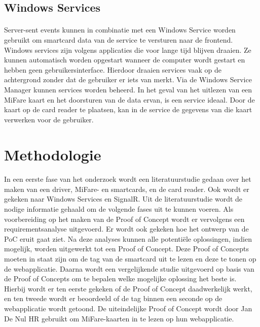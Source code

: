 \bigskip
\subsection{Windows Services}
\paragraph{}
Server-sent events kunnen in combinatie met een Windows Service worden gebruikt om smartcard data van de service te versturen naar de frontend.
Windows services zijn volgens \textcite{MicrosoftWS} applicaties die voor lange tijd blijven draaien. Ze kunnen automatisch worden opgestart wanneer de computer wordt gestart en hebben geen gebruikersinterface. Hierdoor draaien services vaak op de achtergrond zonder dat de gebruiker er iets van merkt. Via de Windows Service Manager kunnen services worden beheerd. In het geval van het uitlezen van een MiFare kaart en het doorsturen van de data ervan, is een service ideaal. Door de kaart op de card reader te plaatsen, kan in de service de gegevens van die kaart verwerken voor de gebruiker.

\bigskip
\section{Methodologie}%
\label{sec:methodologie}
\paragraph{}
In een eerste fase van het onderzoek wordt een literatuurstudie gedaan over het maken van een driver, MiFare- en smartcards, en de card reader. Ook wordt er gekeken naar Windows Services en SignalR. Uit de literatuurstudie wordt de nodige informatie gehaald om de volgende fases uit te kunnen voeren. Als voorbereiding op het maken van de Proof of Concept wordt er vervolgens een requirementsanalyse uitgevoerd. Er wordt ook gekeken hoe het ontwerp van de PoC eruit gaat ziet. Na deze analyses kunnen alle potentiële oplossingen, indien mogelijk, worden uitgewerkt tot een Proof of Concept. Deze Proof of Concepts moeten in staat zijn om de tag van de smartcard uit te lezen en deze te tonen op de webapplicatie.
Daarna wordt een vergelijkende studie uitgevoerd op basis van de Proof of Concepts om te bepalen welke mogelijke oplossing het beste is. Hierbij wordt er ten eerste gekeken of de Proof of Concept daadwerkelijk werkt, en ten tweede wordt er beoordeeld of de tag binnen een seconde op de webapplicatie wordt getoond.
De uiteindelijke Proof of Concept wordt door Jan De Nul HR gebruikt om MiFare-kaarten in te lezen op hun webapplicatie.

